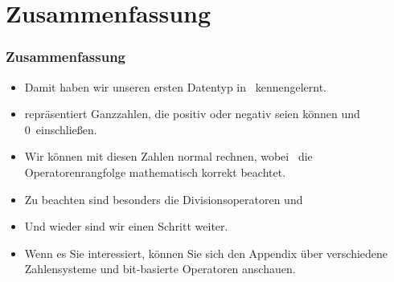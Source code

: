 \documentclass[aspectratio=169,mathserif,notheorems]{beamer}%
\begin{document}
\section{Zusammenfassung}%
%
\begin{frame}%
\frametitle{Zusammenfassung}%
\begin{itemize}%
\item Damit haben wir unseren ersten Datentyp in \python\ kennengelernt.%
\item<2->  repräsentiert Ganzzahlen, die positiv oder negativ seien können und 0~einschließen.%
\item<3-> Wir können mit diesen Zahlen normal rechnen, wobei \python\ die Operatorenrangfolge mathematisch korrekt beachtet.%
\item<4-> Zu beachten sind besonders die Divisionsoperatoren \pythonil{/} und \pythonil{//}%
\item<7-> Und wieder sind wir einen Schritt weiter.%
\item<8-> Wenn es Sie interessiert, können Sie sich den Appendix über verschiedene Zahlensysteme und bit-basierte Operatoren anschauen.%
\end{itemize}%
\end{frame}%
%
\endPresentation%
%
\end{document}
